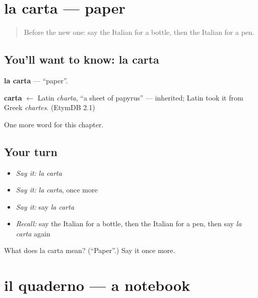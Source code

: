 \section[la carta]{la carta — paper}

\label{lesson:IT-C61-carta}



\begin{quote}
Before the new one: say the Italian for a bottle, then the Italian for a pen.
\end{quote}

\subsection*{You'll want to know: la carta}
\textbf{la carta} — \textquotedblleft{}paper\textquotedblright{}.

\begin{cousinweb}
\textbf{carta} $\leftarrow$ Latin \emph{charta}, \textquotedblleft{}a sheet of papyrus\textquotedblright{} — inherited; Latin took it from Greek \emph{chartes}. (EtymDB 2.1)
\end{cousinweb}

\begin{grammarlens}[title={What you've built}]
One more word for this chapter.
\end{grammarlens}

\subsection*{Your turn}
\begin{itemize}
\raggedright
  \item \emph{Say it:} \emph{la carta}
  \item \emph{Say it:} \emph{la carta}, once more
  \item \emph{Say it:} say \emph{la carta}
  \item \emph{Recall:} say the Italian for a bottle, then the Italian for a pen, then say \emph{la carta} again
\end{itemize}

\begin{tcolorbox}[breakable,colback=teal!4,colframe=teal!35!black,title={Before you move on}]
What does la carta mean? (\textquotedblleft{}Paper\textquotedblright{}.) Say it once more.
\end{tcolorbox}
\section[il quaderno]{il quaderno — a notebook}

